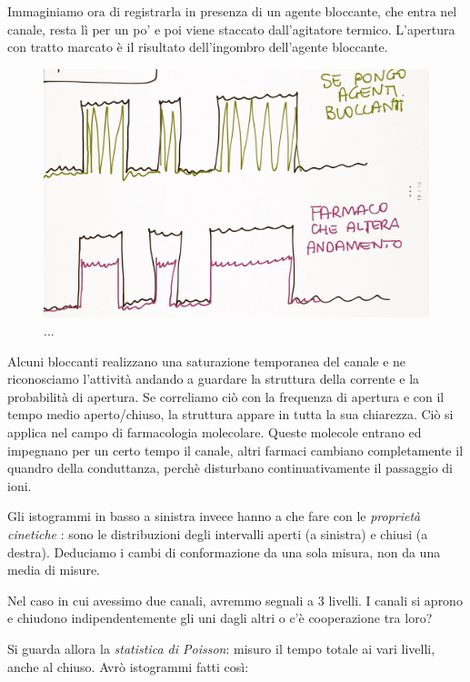 \documentclass[a4paper,12pt]{article}
\begin{document}
Immaginiamo ora di registrarla in presenza di un agente bloccante, che entra nel canale, resta lì per un po' e poi viene staccato dall'agitatore termico. L'apertura con tratto marcato è il risultato dell'ingombro dell'agente bloccante.

\begin{figure}[H]
\centering
\includegraphics[scale=0.1]{immagine/10.jpg}
\caption{...}
\end{figure} 

Alcuni bloccanti realizzano una saturazione temporanea del canale e ne riconosciamo l'attività andando a guardare la struttura della corrente e la probabilità di apertura.
Se correliamo ciò con la frequenza di apertura e con il tempo medio aperto/chiuso, la struttura appare in tutta la sua chiarezza. Ciò si applica nel campo di farmacologia molecolare. Queste molecole entrano ed impegnano per un certo tempo il canale, altri farmaci cambiano completamente il quandro della conduttanza, perchè disturbano continuativamente il passaggio di ioni.

Gli istogrammi in basso a sinistra invece hanno a che fare con le \emph{proprietà cinetiche} : sono le distribuzioni degli intervalli aperti (a sinistra) e chiusi (a destra). Deduciamo i cambi di conformazione da una sola misura, non da una media di misure. 

Nel caso in cui avessimo due canali, avremmo segnali a 3 livelli. I canali si aprono e chiudono indipendentemente gli uni dagli altri o c'è cooperazione tra loro? 

Si guarda allora la \emph{statistica di Poisson}: misuro il tempo totale ai vari livelli, anche al chiuso. Avrò istogrammi fatti così:
\end{document}
